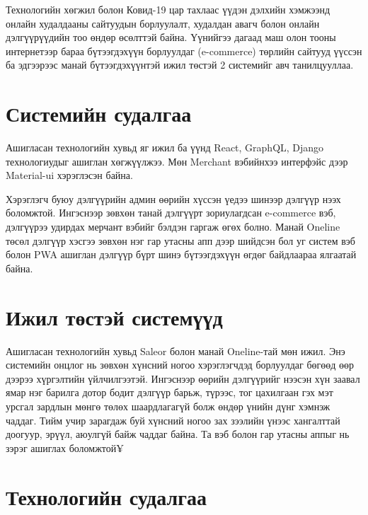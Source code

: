 Технологийн хөгжил болон Ковид-19 цар тахлаас үүдэн дэлхийн хэмжээнд онлайн худалдааны сайтуудын борлуулалт, худалдан авагч болон онлайн дэлгүүрүүдийн тоо өндөр өсөлттэй байна. Үүнийгээ дагаад маш олон тооны интернетээр бараа бүтээгдэхүүн борлуулдаг (e-commerce) төрлийн сайтууд үүссэн ба эдгээрээс манай бүтээгдэхүүнтэй ижил төстэй 2 системийг авч танилцууллаа.
    
    
\section{Системийн судалгаа}
Ашигласан технологийн хувьд яг ижил ба үүнд React, GraphQL, Django технологиудыг ашиглан хөгжүүлжээ. Мөн Merchant вэбийнхээ интерфэйс дээр Material-ui хэрэглэсэн байна. 

Хэрэглэгч буюу дэлгүүрийн админ өөрийн хүссэн үедээ шинээр дэлгүүр нээх боломжтой. Ингэснээр зөвхөн танай дэлгүүрт зориулагдсан e-commerce вэб, дэлгүүрээ удирдах мерчант вэбийг бэлдэн гаргаж өгөх болно. Манай Oneline төсөл дэлгүүр хэсгээ зөвхөн нэг гар утасны апп дээр шийдсэн бол уг систем вэб болон PWA ашиглан дэлгүүр бүрт шинэ бүтээгдэхүүн өгдөг байдлаараа ялгаатай байна. 


\section{Ижил төстэй системүүд}
Ашигласан технологийн хувьд Saleor болон манай Oneline-тай мөн ижил. Энэ системийн онцлог нь зөвхөн хүнсний ногоо хэрэглэгчдэд борлуулдаг бөгөөд өөр дээрээ хүргэлтийн үйлчилгээтэй. Ингэснээр өөрийн дэлгүүрийг нээсэн хүн заавал ямар нэг барилга дотор бодит дэлгүүр барьж, түрээс, тог цахилгаан гэх мэт урсгал зардлын мөнгө төлөх шаардлагагүй болж өндөр үнийн дүнг хэмнэж чаддаг. Тийм учир зарагдаж буй хүнсний ногоо зах зээлийн үнээс хангалттай доогуур, эрүүл, аюулгүй байж чаддаг байна. Та вэб болон гар утасны аппыг нь зэрэг ашиглах боломжтой¥


\section{Технологийн судалгаа}
